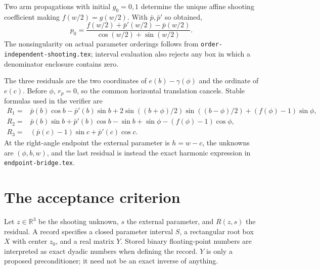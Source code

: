 \documentclass[11pt]{article}
\begin{document}
Two arm propagations with initial $g_0=0,1$ determine the unique affine shooting coefficient making $f(w/2)=g(w/2)$. With $\bar p,\bar p'$ so obtained,
\[
 p_0=\frac{f(w/2)+\bar p'(w/2)-\bar p(w/2)}{\cos(w/2)+\sin(w/2)}.
\]
The nonsingularity on actual parameter orderings follows from \texttt{order-independent-shooting.tex}; interval evaluation also rejects any box in which a denominator enclosure contains zero.

The three residuals are the two coordinates of $e(b)-\gamma(\phi)$ and the ordinate of $e(c)$. Before $\phi$, $r_p=0$, so the common horizontal translation cancels. Stable formulas used in the verifier are
\begin{align*}
 R_1={}&\bar p(b)\cos b-\bar p'(b)\sin b
       +2\sin((b+\phi)/2)\sin((b-\phi)/2)+(f(\phi)-1)\sin\phi,\\
 R_2={}&\bar p(b)\sin b+\bar p'(b)\cos b-\sin b+\sin\phi
       -(f(\phi)-1)\cos\phi,\\
 R_3={}&(\bar p(c)-1)\sin c+\bar p'(c)\cos c.
\end{align*}
At the right-angle endpoint the external parameter is $h=w-c$, the unknowns are $(\phi,b,w)$, and the last residual is instead the exact harmonic expression in \texttt{endpoint-bridge.tex}.

\section{The acceptance criterion}
Let $z\in\mathbb R^3$ be the shooting unknown, $s$ the external parameter, and $R(z,s)$ the residual. A record specifies a closed parameter interval $S$, a rectangular root box $X$ with center $z_0$, and a real matrix $Y$. Stored binary floating-point numbers are interpreted as exact dyadic numbers when defining the record. $Y$ is only a proposed preconditioner; it need not be an exact inverse of anything.
\end{document}
